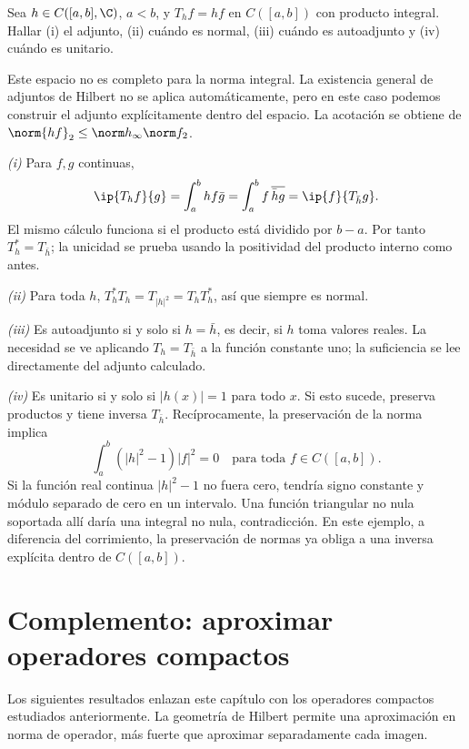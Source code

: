 \begin{ejercicio}
Sea $h\in C([a,b],\C)$, $a<b$, y $T_hf=hf$ en $C([a,b])$ con producto integral. Hallar (i) el adjunto, (ii) cuándo es normal, (iii) cuándo es autoadjunto y (iv) cuándo es unitario.
\end{ejercicio}
\begin{solucion}
Este espacio no es completo para la norma integral. La existencia general de adjuntos de Hilbert no se aplica automáticamente, pero en este caso podemos construir el adjunto explícitamente dentro del espacio. La acotación se obtiene de $\norm{hf}_2\leq\norm h_\infty\norm f_2$.

\emph{(i)} Para $f,g$ continuas,
\[
 \ip{T_hf}{g}=\int_a^b hf\bar g
 =\int_a^b f\,\overline{\bar h g}=\ip{f}{T_{\bar h}g}.
\]
El mismo cálculo funciona si el producto está dividido por $b-a$. Por tanto $T_h^*=T_{\bar h}$; la unicidad se prueba usando la positividad del producto interno como antes.

\emph{(ii)} Para toda $h$, $T_h^*T_h=T_{|h|^{2}}=T_hT_h^*$, así que siempre es normal.

\emph{(iii)} Es autoadjunto si y solo si $h=\bar h$, es decir, si $h$ toma valores reales. La necesidad se ve aplicando $T_h=T_{\bar h}$ a la función constante uno; la suficiencia se lee directamente del adjunto calculado.

\emph{(iv)} Es unitario si y solo si $|h(x)|=1$ para todo $x$. Si esto sucede, preserva productos y tiene inversa $T_{\bar h}$. Recíprocamente, la preservación de la norma implica
\[
 \int_a^b (|h|^{2}-1)|f|^{2}=0\quad\text{para toda }f\in C([a,b]).
\]
Si la función real continua $|h|^{2}-1$ no fuera cero, tendría signo constante y módulo separado de cero en un intervalo. Una función triangular no nula soportada allí daría una integral no nula, contradicción. En este ejemplo, a diferencia del corrimiento, la preservación de normas ya obliga a una inversa explícita dentro de $C([a,b])$.
\end{solucion}

\section{Complemento: aproximar operadores compactos}
Los siguientes resultados enlazan este capítulo con los operadores compactos estudiados anteriormente. La geometría de Hilbert permite una aproximación en norma de operador, más fuerte que aproximar separadamente cada imagen.

